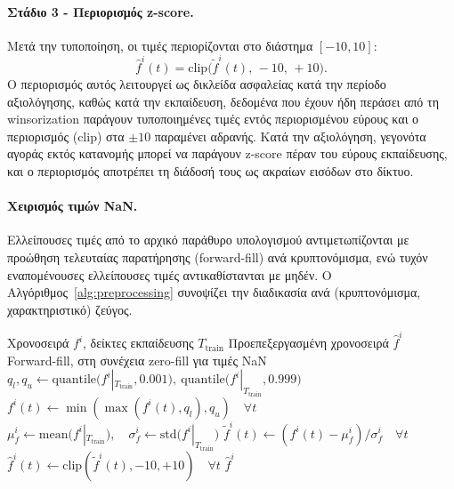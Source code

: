 \paragraph{Στάδιο 3 - Περιορισμός z-score.}
Μετά την τυποποίηση, οι τιμές περιορίζονται στο διάστημα $[-10, 10]$:
\begin{equation}
  \hat{f}^{i}(t) = \mathrm{clip}\bigl(\tilde{f}^{i}(t),\, -10,\, +10\bigr).
  \label{eq:clip}
\end{equation}
Ο περιορισμός αυτός λειτουργεί ως δικλείδα ασφαλείας κατά την περίοδο
αξιολόγησης, καθώς κατά την εκπαίδευση, δεδομένα που έχουν ήδη περάσει από τη
winsorization παράγουν τυποποιημένες τιμές εντός περιορισμένου εύρους και ο
περιορισμός (clip) στα $\pm 10$ παραμένει αδρανής. Κατά την αξιολόγηση, γεγονότα
αγοράς εκτός κατανομής μπορεί να παράγουν z-score πέραν του εύρους
εκπαίδευσης, και ο περιορισμός αποτρέπει τη διάδοσή τους ως ακραίων εισόδων
στο δίκτυο.

\paragraph{Χειρισμός τιμών NaN.}
Ελλείπουσες τιμές από το αρχικό παράθυρο υπολογισμού αντιμετωπίζονται με
προώθηση τελευταίας παρατήρησης (forward-fill) ανά κρυπτονόμισμα, ενώ τυχόν
εναπομένουσες ελλείπουσες τιμές αντικαθίστανται με μηδέν. 
Ο Αλγόριθμος~\ref{alg:preprocessing} συνοψίζει την διαδικασία ανά 
(κρυπτονόμισμα, χαρακτηριστικό) ζεύγος.

\begin{algorithm}[t]
  \caption{Αλγόριθμος προεπεξεργασίας χαρακτηριστικών}
  \label{alg:preprocessing}
  \begin{algorithmic}[1]
    \Require Χρονοσειρά $f^{i}$, δείκτες εκπαίδευσης $T_{\mathrm{train}}$
    \Ensure Προεπεξεργασμένη χρονοσειρά $\hat{f}^{i}$
    \State Forward-fill, στη συνέχεια zero-fill για τιμές NaN
    \State $q_l, q_u \gets \mathrm{quantile}\bigl(f^{i}|_{T_{\mathrm{train}}}, 0{.}001\bigr),\ \mathrm{quantile}\bigl(f^{i}|_{T_{\mathrm{train}}}, 0{.}999\bigr)$
    \State $f^{i}(t) \gets \min(\max(f^{i}(t), q_l), q_u)\quad \forall t$
    \State $\mu^{i}_{f} \gets \mathrm{mean}\bigl(f^{i}|_{T_{\mathrm{train}}}\bigr),\quad \sigma^{i}_{f} \gets \mathrm{std}\bigl(f^{i}|_{T_{\mathrm{train}}}\bigr)$
    \State $\tilde{f}^{i}(t) \gets (f^{i}(t) - \mu^{i}_{f}) / \sigma^{i}_{f}\quad \forall t$
    \State $\hat{f}^{i}(t) \gets \mathrm{clip}(\tilde{f}^{i}(t), -10, +10)\quad \forall t$
    \State \Return $\hat{f}^{i}$
  \end{algorithmic}
\end{algorithm}

